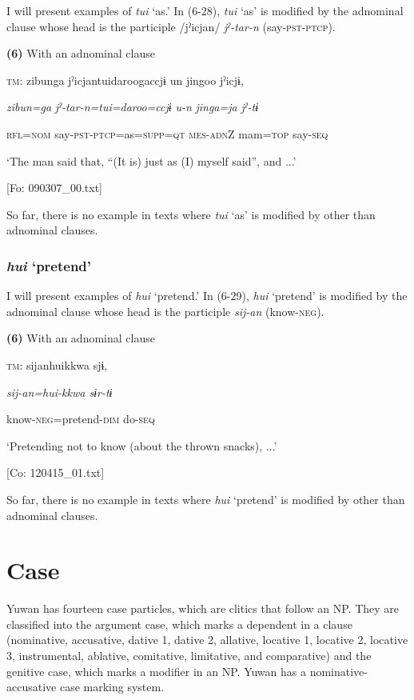 I will present examples of \textit{tui} ‘as.’ In (6-28), \textit{tui} ‘as’ is modified by the adnominal clause whose head is the participle /jˀicjan/ \textit{jˀ-tar-n} (say-\textsc{pst}-\textsc{ptcp}).

\textbf{(6)}  With an adnominal clause

  \textsc{tm}:  {\textbar}zibunga{\textbar}  jˀicjantuidaroogaccjɨ  un  jingoo  jˀicjɨ,

    \textit{zibun=ga}  \textit{jˀ-tar-n=tui=daroo=ccjɨ}  \textit{u-n}  \textit{jinga=ja}  \textit{jˀ-tɨ}

    \textsc{rfl}=\textsc{nom}  say-\textsc{pst}-\textsc{ptcp}=as=\textsc{supp}=\textsc{qt}  \textsc{mes}-\textsc{adn}Z  mam=\textsc{top}  say-\textsc{seq}

    ‘The man said that, “(It is) just as (I) myself said”, and ...’

    [Fo: 090307\_00.txt]

So far, there is no example in texts where \textit{tui} ‘as’ is modified by other than adnominal clauses.

\subsubsection{ \textit{hui} ‘pretend’}

I will present examples of \textit{hui} ‘pretend.’ In (6-29), \textit{hui} ‘pretend’ is modified by the adnominal clause whose head is the participle \textit{sij-an} (know-\textsc{neg}).

\textbf{(6)}  With an adnominal clause

  \textsc{tm}:  sijanhuikkwa  sjɨ,

    \textit{sij-an=hui{}-kkwa  sɨr-tɨ}

    know-\textsc{neg}=pretend-\textsc{dim}  do-\textsc{seq}

    ‘Pretending not to know (about the thrown snacks), ...’

    [Co: 120415\_01.txt]

So far, there is no example in texts where \textit{hui} ‘pretend’ is modified by other than adnominal clauses.

\section{ Case}

Yuwan has fourteen case particles, which are clitics that follow an NP. They are classified into the argument case, which marks a dependent in a clause (nominative, accusative, dative 1, dative 2, allative, locative 1, locative 2, locative 3, instrumental, ablative, comitative, limitative, and comparative) and the genitive case, which marks a modifier in an NP. Yuwan has a nominative-accusative case marking system.

